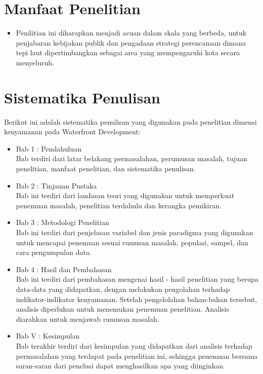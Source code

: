 \documentclass[../thesis.tex]{subfiles}
\begin{document}
\section{Manfaat Penelitian}
\begin{itemize}
	\item Penilitian ini diharapkan menjadi acuan dalam skala yang berbeda, untuk penjabaran kebijakan publik dan pengadaan strategi perencanaan dimana tepi laut dipertimbangkan sebagai area yang mempengaruhi kota secara menyeluruh.
\end{itemize}

\section{Sistematika Penulisan}
Berikut ini adalah sistematika penulisan yang digunakan pada penelitian dimensi kenyamanan pada Waterfront Development:
\begin{itemize}
	\item Bab 1 : Pendahuluan\\
Bab terdiri dari latar belakang permasalahan, perumusan masalah, tujuan penelitian, manfaat penelitian, dan sistematika penulisan.
	\item Bab 2 : Tinjauan Pustaka\\
Bab ini terdiri dari landasan teori yang digunakan untuk memperkuat penemuan masalah, penelitian terdahulu dan kerangka pemikiran.
	\item Bab 3 : Metodologi Penelitian\\
Bab ini terdiri dari penjelasan variabel dan jenis paradigma yang digunakan untuk mencapai penemuan sesuai rumusan masalah, populasi, sampel, dan cara pengumpulan data.
	\item Bab 4 : Hasil dan Pembahasan\\
Bab ini terdiri dari pembahasan mengenai hasil - hasil penelitian yang berupa data-data yang didapatkan, dengan melakukan pengolahan terhadap indikator-indikator kenyamanan. Setelah pengelolahan bahan-bahan tersebut, analisis diperlukan untuk menemukan penemuan penelitian. Analisis diarahkan untuk menjawab rumusan masalah.
	\item Bab V : Kesimpulan\\
Bab terakhir terdiri dari kesimpulan yang didapatkan dari analisis terhadap permasalahan yang terdapat pada penelitian ini, sehingga penemuan bersama saran-saran dari penelusi dapat menghasilkan apa yang diinginkan.


\end{itemize}
\end{document}
